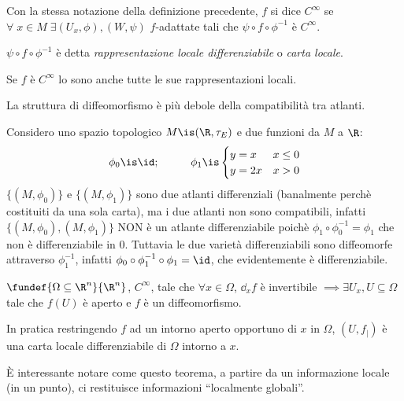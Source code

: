 \begin{defn}[$C^\infty$]
Con la stessa notazione della definizione precedente, $f$ si dice \emph{$C^\infty$} se
$\forall \; x \in M \;  \exists (U_x,\phi), (W,\psi)$ $f$-adattate tali che $\psi \circ f \circ \phi^{-1}$ è $C^\infty$.

$\psi \circ f \circ \phi^{-1}$ è detta \emph{rappresentazione locale differenziabile} o \emph{carta locale}.
\end{defn}

\begin{prop}
Se $f$ è $C^\infty$ lo sono anche tutte le sue rappresentazioni locali.
\end{prop}

\begin{oss}
La struttura di diffeomorfismo è più debole della compatibilità tra atlanti.
\end{oss}

\begin{es}
Considero uno spazio topologico $M \is (\R,\tau_E)$ e due funzioni da $M$ a $\R$:
\begin{equation*}
\phi_0\is \id ;\hspace{1cm} \phi_1\is\begin{cases}y=x & x\le 0 \\ y=2x & x>0 \end{cases}
\end{equation*}
$\{(M,\phi_0)\}$ e $\{(M,\phi_1)\}$ sono due atlanti differenziali (banalmente perchè costituiti da una sola carta), ma i due atlanti non sono compatibili, infatti $\{(M,\phi_0),(M,\phi_1)\}$ NON è un atlante differenziabile poichè $\phi_1 \circ \phi_0^{-1} = \phi_1$ che non è differenziabile in 0.
Tuttavia le due varietà differenziabili sono diffeomorfe attraverso $\phi_1^{-1}$, infatti $\phi_0 \circ \phi_1^{-1} \circ \phi_1 = \id$, che evidentemente è differenziabile.
\end{es}

\begin{oss}
\end{oss}

\begin{teo}
$\fundef{\Omega \subseteq \R^n}{\R^n}$, $C^\infty$, tale che $\forall x \in \Omega$, $\dd_xf$ è invertibile $\implies \exists U_x, U\subseteq \Omega$ tale che $f(U)$ è aperto e $f$ è un diffeomorfismo.
\end{teo}

\begin{oss}
In pratica restringendo $f$ ad un intorno aperto opportuno di $x$ in $\Omega$, $(U,f_|)$ è una carta locale differenziabile di $\Omega$ intorno a $x$.

È interessante notare come questo teorema, a partire da un informazione locale (in un punto), ci restituisce informazioni ``localmente globali''.
\end{oss}

